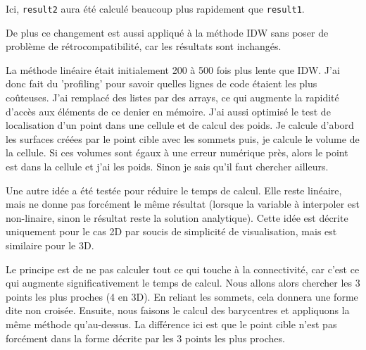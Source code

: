 Ici, \texttt{result2} aura été calculé beaucoup plus rapidement que \texttt{result1}.

De plus ce changement est aussi appliqué à la méthode IDW sans poser de problème de rétrocompatibilité, car les résultats sont inchangés.

\vspace{0.5cm}

La méthode linéaire était initialement 200 à 500 fois plus lente que IDW. J'ai donc fait du 'profiling' pour savoir quelles lignes de code étaient les plus coûteuses. J'ai remplacé des listes par des arrays, ce qui augmente la rapidité d'accès aux éléments de ce denier en mémoire.
J'ai aussi optimisé le test de localisation d'un point dans une cellule et de calcul des poids.
Je calcule d'abord les surfaces créées par le point cible avec les sommets puis, je calcule le volume de la cellule. Si ces volumes sont égaux à une erreur numérique près, alors le point est dans la cellule et j'ai les poids. Sinon je sais qu'il faut chercher ailleurs.

\vspace{0.5cm}

Une autre idée a été testée pour réduire le temps de calcul. Elle reste linéaire, mais ne donne pas forcément le même résultat (lorsque la variable à interpoler est non-linaire, sinon le résultat reste la solution analytique). Cette idée est décrite uniquement pour le cas 2D par soucis de simplicité de visualisation, mais est similaire pour le 3D.

Le principe est de ne pas calculer tout ce qui touche à la connectivité, car c'est ce qui augmente significativement le temps de calcul.
Nous allons alors chercher les 3 points les plus proches (4 en 3D). En reliant les sommets, cela donnera une forme dite non croisée. 
Ensuite, nous faisons le calcul des barycentres et appliquons la même méthode qu'au-dessus.
La différence ici est que le point cible n'est pas forcément dans la forme décrite par les 3 points les plus proches.



